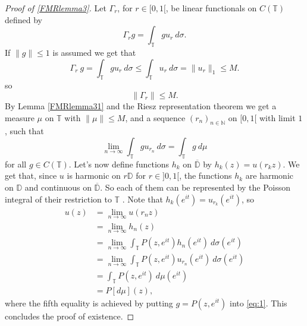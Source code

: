 \documentclass[a4paper,12pt,twoside,BCOR=10mm]{scrbook}
\theoremstyle{definition}
\theoremstyle{definition}
\theoremstyle{definition}
\begin{document}
\begin{proof}[Proof of \ref{FMRlemma3}]
Let $\Gamma_r$, for $r \in [0, 1[$, be linear functionals on $C(\mathbb{T})$ defined by
\[
	\Gamma_r g = \int_{\mathbb{T}} gu_r\ d\sigma.
\]
If $\|g\| \leq 1$ is assumed we get that
\[
\Gamma_r\ g = \int_{\mathbb{T}} gu_r\ d\sigma \leq \int_{\mathbb{T}} u_r\ d\sigma = \|u_r\|_1 \leq M.
\]
so
\[
	\|\Gamma_r\| \leq M.
\]
By Lemma \ref{FMRlemma31} and the Riesz representation theorem we get a measure $\mu$ on $\mathbb{T}$ with $\|\mu\| \leq M$, and a sequence $(r_n)_{n \in \mathbb{N}}$ on $[0, 1[$ with limit $1$, such that
\begin{equation}
	\label{eq:1}
	\lim_{n \rightarrow \infty} \int_{\mathbb{T}} gu_{r_n}\ d\sigma = \int_{\mathbb{T}}g\ d\mu
\end{equation}
for all $g \in C(\mathbb{T})$.
Let's now define functions $h_k$ on $\overline{\mathbb{D}}$ by $h_k(z) = u(r_kz)$.
We get that, since $u$ is harmonic on $r\mathbb{D}$ for $r \in ]0, 1[$, the functions $h_k$ are harmonic on $\mathbb{D}$ and continuous on $\overline{\mathbb{D}}$.
So each of them can be represented by the Poisson integral of their restriction to $\mathbb{T}$ \citep[Theroem $11.9$]{rudin2}.
Note that $h_k(e^{it}) = u_{r_k}(e^{it})$, so
\begin{align*}
	u(z)
	&= \lim_{n \rightarrow \infty} u(r_nz)\\
	&= \lim_{n \rightarrow \infty} h_n(z)\\
	&= \lim_{n \rightarrow \infty} \int_{\mathbb{T}}P(z, e^{it}) h_n(e^{it})\ d\sigma(e^{it})\\
	&= \lim_{n \rightarrow \infty} \int_{\mathbb{T}}P(z, e^{it}) u_{r_n}(e^{it})\ d\sigma(e^{it})\\
	&= \int_{\mathbb{T}}P(z, e^{it})\ d\mu(e^{it})\\
	&= P[d\mu](z),
\end{align*}
where the fifth equality is achieved by putting $g = P(z, e^{it})$ into \ref{eq:1}.
This concludes the proof of existence.


\end{proof}
\end{document}
